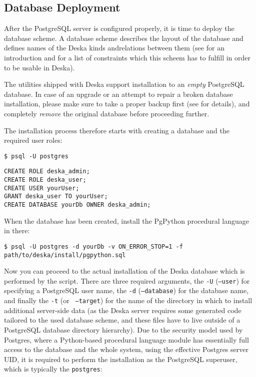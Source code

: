 \documentclass[deska]{subfiles}
\begin{document}
\subsection{Database Deployment}
\label{sec:build-database-deployment}

After the PostgreSQL server is configured properly, it is time to deploy the database scheme.  A database scheme
describes the layout of the database and defines names of the Deska kinds andrelations between them (see
 for an introduction and  for a list of constraints
which this scheem has to fulfill in order to be usable in Deska).

The utilities shipped with Deska support installation to an {\em empty} PostgreSQL database.  In case of an upgrade or
an attempt to repair a broken database installation, please make sure to take a proper backup first (see
 for details), and completely {\em remove} the original database before proceeding further.

The installation process therefore starts with creating a database and the required user roles:

\begin{verbatim}
$ psql -U postgres
\end{verbatim}
\begin{verbatim}
CREATE ROLE deska_admin;
CREATE ROLE deska_user;
CREATE USER yourUser;
GRANT deska_user TO yourUser;
CREATE DATABASE yourDb OWNER deska_admin;
\end{verbatim}

When the database has been created, install the PgPython procedural language in there:

\begin{verbatim}
$ psql -U postgres -d yourDb -v ON_ERROR_STOP=1 -f path/to/deska/install/pgpython.sql
\end{verbatim}

Now you can proceed to the actual installation of the Deska database which is performed by the
 script.  There are three required arguments, the {\tt -U} ({\tt --user}) for specifying
a PostgreSQL user name, the {\tt -d} ({\tt --database}) for the database name, and finally the {\tt -t} (or {\tt
--target}) for the name of the directory in which to install additional server-side data (as the Deska server requires
some generated code tailored to the used database scheme, and these files have to live outside of a PostgreSQL database
directory hierarchy).  Due to the security model used by Postgres, where a Python-based procedural language module has
essentially full access to the database and the whole system, using the effective Postgres server UID, it is required to
perform the installation as the PostgreSQL superuser, which is typically the {\tt postgres}:
\end{document}
